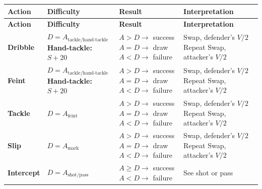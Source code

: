 \documentclass[12pt]{article}
\begin{document}
\clearpage
\begingroup
\tiny
\renewcommand{\arraystretch}{1.2}
\begin{xltabular}{\textwidth}{>{\raggedright\arraybackslash}p{0.15\textwidth}>{\raggedright\arraybackslash}p{0.25\textwidth}>{\raggedright\arraybackslash}p{0.25\textwidth}>{\raggedright\arraybackslash}X}
\toprule
\textbf{Action} & \textbf{Difficulty} & \textbf{Result} & \textbf{Interpretation} \\
\midrule
\endfirsthead
\toprule
\textbf{Action} & \textbf{Difficulty} & \textbf{Result} & \textbf{Interpretation} \\
\midrule
\endhead
\bottomrule
\endfoot
\bottomrule
\endlastfoot
\textbf{Dribble} & $D = A_{\text{tackle/hand-tackle}}$ \newline \textbf{Hand-tackle:} $S + 20$ & $A > D \rightarrow$ success \newline $A = D \rightarrow$ draw \newline $A < D \rightarrow$ failure & Swap, defender's $V/2$ \newline Repeat \newline Swap, attacker's $V/2$ \\
\midrule
\textbf{Feint} & $D = A_{\text{tackle/hand-tackle}}$ \newline \textbf{Hand-tackle:} $S + 20$ & $A > D \rightarrow$ success \newline $A = D \rightarrow$ draw \newline $A < D \rightarrow$ failure & Swap, defender's $V/2$ \newline Repeat \newline Swap, attacker's $V/2$ \\
\midrule
\textbf{Tackle} & $D = A_{\text{feint}}$ & $A > D \rightarrow$ success \newline $A = D \rightarrow$ draw \newline $A < D \rightarrow$ failure & Swap, defender's $V/2$ \newline Repeat \newline Swap, attacker's $V/2$ \\
\midrule
\textbf{Slip} & $D = A_{\text{mark}}$ & $A > D \rightarrow$ success \newline $A = D \rightarrow$ draw \newline $A < D \rightarrow$ failure & Swap, defender's $V/2$ \newline Repeat \newline Swap, attacker's $V/2$ \\
\midrule
\textbf{Intercept} & $D = A_{\text{shot/pass}}$ & $A \geq D \rightarrow$ success \newline $A < D \rightarrow$ failure & See shot or pass \\

\end{xltabular}
\end{document}
